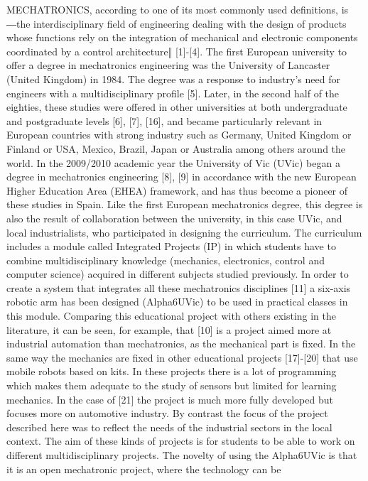 MECHATRONICS, according to one of its most commonly
used definitions, is ―the interdisciplinary field of engineering
dealing with the design of products whose functions rely on
the integration of mechanical and electronic components
coordinated by a control architecture‖ [1]-[4]. The first
European university to offer a degree in mechatronics
engineering was the University of Lancaster (United
Kingdom) in 1984. The degree was a response to industry’s
need for engineers with a multidisciplinary profile [5]. Later,
in the second half of the eighties, these studies were offered in
other universities at both undergraduate and postgraduate
levels [6], [7], [16], and became particularly relevant in
European countries with strong industry such as Germany,
United Kingdom or Finland or USA, Mexico, Brazil, Japan or
Australia among others around the world. In the 2009/2010
academic year the University of Vic (UVic) began a degree in
mechatronics engineering [8], [9] in accordance with the new
European Higher Education Area (EHEA) framework, and has
thus become a pioneer of these studies in Spain. Like the first
European mechatronics degree, this degree is also the result of
collaboration between the university, in this case UVic, and
local industrialists, who participated in designing the
curriculum. The curriculum includes a module called
Integrated Projects (IP) in which students have to combine
multidisciplinary knowledge (mechanics, electronics, control
and computer science) acquired in different subjects studied
previously. In order to create a system that integrates all these
mechatronics disciplines [11] a six-axis robotic arm has been
designed (Alpha6UVic) to be used in practical classes in this
module. Comparing this educational project with others
existing in the literature, it can be seen, for example, that [10]
is a project aimed more at industrial automation than
mechatronics, as the mechanical part is fixed. In the same way
the mechanics are fixed in other educational projects [17]-[20]
that use mobile robots based on kits. In these projects there is
a lot of programming which makes them adequate to the study
of sensors but limited for learning mechanics. In the case of
[21] the project is much more fully developed but focuses
more on automotive industry. By contrast the focus of the
project described here was to reflect the needs of the industrial
sectors in the local context. The aim of these kinds of projects
is for students to be able to work on different multidisciplinary
projects. The novelty of using the Alpha6UVic is that it is an
open mechatronic project, where the technology can be
